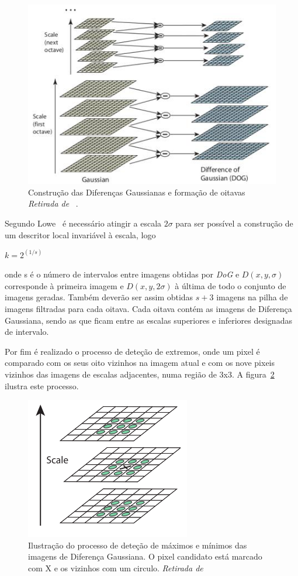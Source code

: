 \begin{enumerate}
\begin{figure}[h]
\centering
\includegraphics[width=0.7\linewidth]{./figures/sift_dog.jpg}
\caption{ Construção das Diferenças Gaussianas e formação de oitavas \textit{Retirada de}~\cite{Lowe2004} .}
\label{fig:siftdog}
\end{figure}

Segundo Lowe~\cite{Lowe2004}  é necessário atingir a escala $ 2\sigma $ para ser possível a construção de um descritor local invariável à escala, logo

$ k = 2^{\left(1/s \right)} $

onde s é o número de intervalos entre imagens obtidas por \textit{DoG} e $ D(x, y, \sigma) $ corresponde à primeira imagem e $ D(x, y, 2\sigma) $ à última de todo o conjunto de imagens geradas. Também deverão ser assim obtidas $s + 3$ imagens na pilha de imagens filtradas para cada oitava. Cada oitava contém as imagens de Diferença Gaussiana, sendo as que ficam entre as escalas superiores e inferiores designadas de intervalo. 

Por fim é realizado o processo de deteção de extremos, onde um pixel é comparado com os seus oito vizinhos na imagem atual e com os nove pixeis vizinhos das imagens de escalas adjacentes, numa região de 3x3. A figura~\ref{fig:siftdog2} ilustra este processo.  

\begin{figure}[h]
\centering
\includegraphics[width=0.4\linewidth]{./figures/sift_dog2.png}
\caption{Ilustração do processo de deteção de máximos e mínimos das imagens de Diferença Gaussiana. O pixel candidato está marcado com X e os vizinhos com um circulo. \textit{Retirada de}~\cite{Lowe2004}}
\label{fig:siftdog2}
\end{figure}


\end{enumerate}
